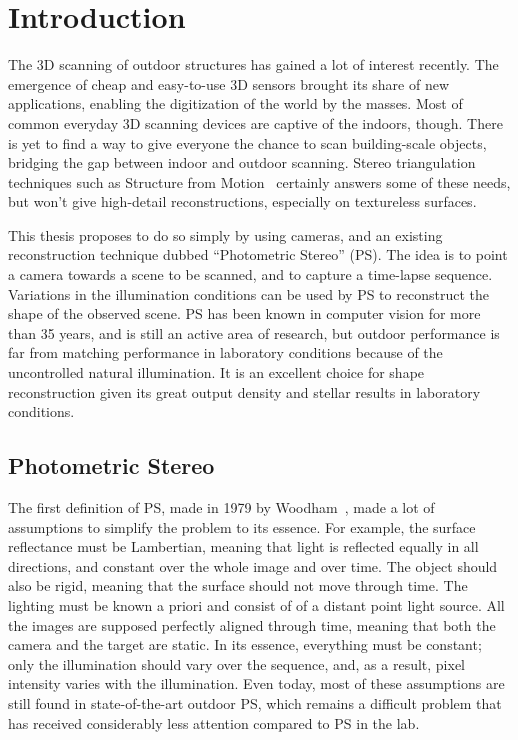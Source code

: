
\chapter{Introduction}

The 3D scanning of outdoor structures has gained a lot of interest recently. The emergence of cheap and easy-to-use 3D sensors brought its share of new applications, enabling the digitization of the world by the masses. Most of common everyday 3D scanning devices are captive of the indoors, though. There is yet to find a way to give everyone the chance to scan building-scale objects, bridging the gap between indoor and outdoor scanning. Stereo triangulation techniques such as Structure from Motion~\cite{agarwal-cacm-11} certainly answers some of these needs, but won't give high-detail reconstructions, especially on textureless surfaces.

This thesis proposes to do so simply by using cameras, and an existing reconstruction technique dubbed ``Photometric Stereo'' (PS). The idea is to point a camera towards a scene to be scanned, and to capture a time-lapse sequence. Variations in the illumination conditions can be used by PS to reconstruct the shape of the observed scene. PS has been known in computer vision for more than 35 years, and is still an active area of research, but outdoor performance is far from matching performance in laboratory conditions because of the uncontrolled natural illumination. It is an excellent choice for shape reconstruction given its great output density and stellar results in laboratory conditions.

\section{Photometric Stereo}
\label{sec:ps_ori}

The first definition of PS, made in 1979 by Woodham~\cite{Woodham1979}, made a lot of assumptions to simplify the problem to its essence. For example, the surface reflectance must be Lambertian, meaning that light is reflected equally in all directions, and constant over the whole image and over time. The object should also be rigid, meaning that the surface should not move through time. The lighting must be known a priori and consist of of a distant point light source. All the images are supposed perfectly aligned through time, meaning that both the camera and the target are static. In its essence, everything must be constant; only the illumination should vary over the sequence, and, as a result, pixel intensity varies with the illumination. Even today, most of these assumptions are still found in state-of-the-art outdoor PS, which remains a difficult problem that has received considerably less attention compared to PS in the lab. 

